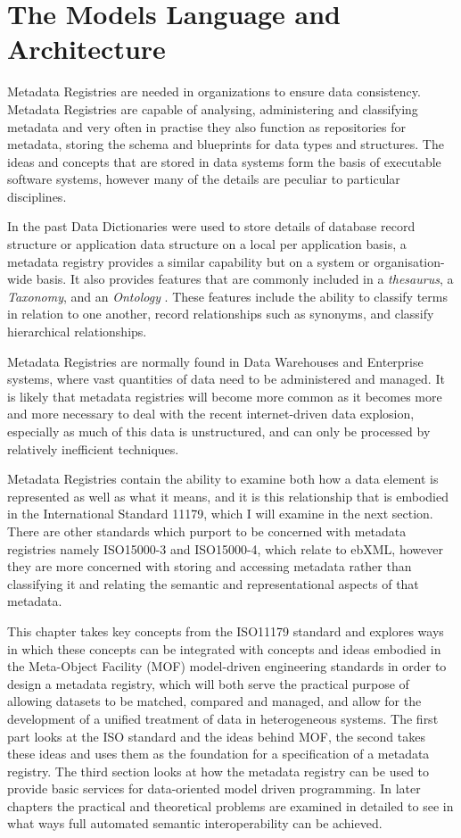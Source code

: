 \section{The Models Language and Architecture}

Metadata Registries are needed in organizations to ensure data consistency. Metadata Registries are capable of analysing, administering and classifying metadata and very often in practise they also function as repositories for metadata, storing the schema and blueprints for data types and structures. The ideas and concepts that are stored in data systems form the basis of executable software systems, however many of the details are peculiar to particular disciplines.  

In the past Data Dictionaries were used to store details of database record structure or application data structure on a local per application basis, a metadata registry provides a similar capability but on a system or organisation-wide basis. It also provides features that are commonly included in a \emph{thesaurus}, a \emph{Taxonomy}, and an \emph{Ontology} . These features include the ability to classify terms in relation to one another, record relationships such as synonyms, and classify hierarchical relationships.

Metadata Registries are normally found in Data Warehouses and Enterprise systems, where vast quantities of data need to be administered and managed. It is likely that metadata registries will become more common as it becomes more and more necessary to deal with the recent internet-driven data explosion, especially as much of this data is unstructured, and can only be processed by relatively inefficient techniques.

Metadata Registries contain the ability to examine both how a data element is represented as well as what it means, and it is this relationship that is embodied in the International Standard 11179, which I will examine in the next section. There are other standards which purport to be concerned with metadata registries namely ISO15000-3 and ISO15000-4, which relate to ebXML, however they are more concerned with storing and accessing metadata rather than classifying it and relating the semantic and representational aspects of that metadata.

This chapter takes key concepts from the ISO11179 standard and explores ways in which these concepts can be integrated with concepts and ideas embodied in the Meta-Object Facility (MOF) model-driven engineering standards in order to design a metadata registry, which will both serve the practical purpose of allowing datasets to be matched, compared and managed, and allow for the development of a unified treatment of data in heterogeneous systems. The first part looks at the ISO standard and the ideas behind MOF, the second takes these ideas and uses them as the foundation for a specification of a metadata registry. The third section looks at how the metadata registry can be used to provide basic services for data-oriented model driven programming. In later chapters the practical and theoretical problems are examined in detailed to see in what ways full automated semantic interoperability can be achieved.


